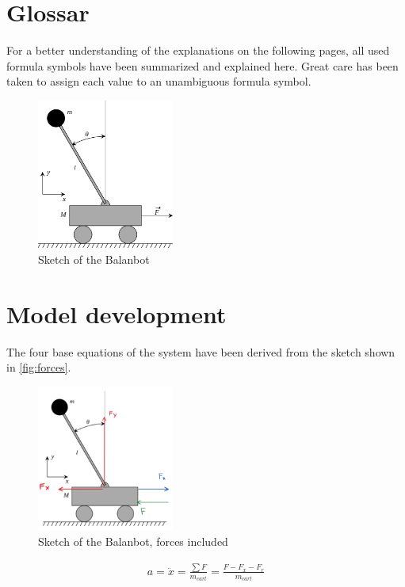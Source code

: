 \section{Glossar}
For a better understanding of the explanations on the following pages, all used formula symbols have been summarized and explained here. Great care has been taken to assign each value to an unambiguous formula symbol.
\begin{figure}[H]
    \centering
    \includegraphics[width=0.4\textwidth]{Lab_report/pics/modelBuilding/300px-Cart-pendulum.svg.png}
    \caption{Sketch of the Balanbot}
    \label{fig:balanbot_sketch}
\end{figure}


\section{Model development}
The four base equations of the system have been derived from the sketch shown in \autoref{fig:forces}.

\begin{figure}[H]
    \centering
    \includegraphics[width=0.4\textwidth]{Lab_report/pics/modelBuilding/forces.png}
    \caption{Sketch of the Balanbot, forces included}
    \label{fig:forces}
\end{figure}
\newpage
    \begin{align}    \label{eq: base 1 (a)}
        a = \ddot{x} = \frac{\sum F}{m_{cart}} = \frac{F-F_x-F_r}{m_{cart}}
    \end{align}

